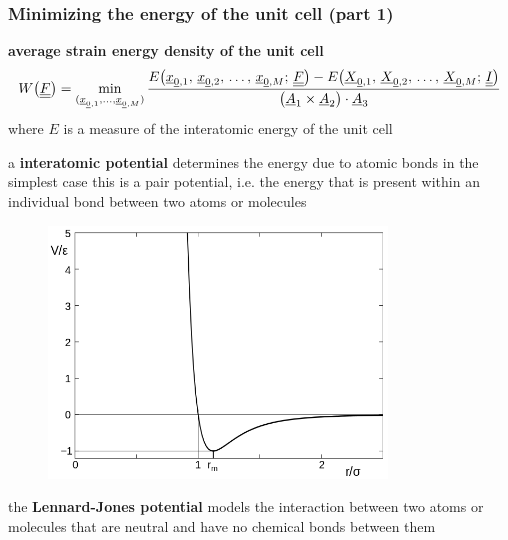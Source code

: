 \begin{frame}
  \frametitle{Minimizing the energy of the unit cell (part 1)}

  \textbf{average strain energy density of the unit cell}
  \begin{displaymath}
    W \bigl( \underline{\underline{F}} \bigr) =
    \min_{(\underline{x}_{\underline{0},1},\dots,\underline{x}_{\underline{0},M})} \frac{E \bigl( \underline{x}_{\underline{0},1} , \, \underline{x}_{\underline{0},2} , \, \dots , \, \underline{x}_{\underline{0},M} ; \, \underline{\underline{F}} \bigr) - E \bigl( \underline{X}_{\underline{0},1} , \, \underline{X}_{\underline{0},2} , \, \dots , \, \underline{X}_{\underline{0},M} ; \, \underline{\underline{I}} \bigr)}{\bigl( \underline{A}_1 \times \underline{A}_2 \bigr) \cdot \underline{A}_3}
  \end{displaymath}
  where $E$ is a measure of the interatomic energy of the unit cell
  
  \vspace{0.5em}
  a \textbf{interatomic potential} determines the energy due to atomic bonds \newline
  in the simplest case this is a pair potential, i.e. the energy that is present within an individual bond between two atoms or molecules
  
  \vspace{-0.3em}
  \begin{multicols}{2}
    \noindent
    
    \begin{figure}
      \centering
      \includegraphics[width=9cm, keepaspectratio=true]{sections/cosserat_rods/images/LJpotential}
    \end{figure}
    
    the \textbf{Lennard-Jones potential} models the interaction between two atoms or molecules that are neutral and have no chemical bonds between them
    

\end{multicols}
\end{frame}
